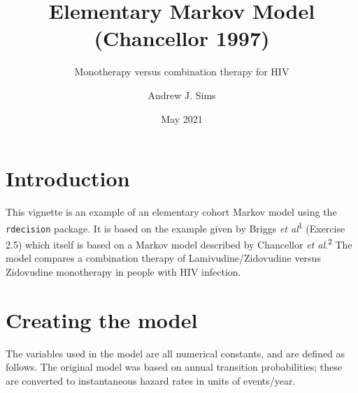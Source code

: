 \documentclass[
]{article}
\title{Elementary Markov Model (Chancellor 1997)}
\subtitle{Monotherapy versus combination therapy for HIV}
\author{Andrew J. Sims}
\date{May 2021}
\begin{document}
\maketitle

\hypertarget{introduction}{%
\section{Introduction}\label{introduction}}

This vignette is an example of an elementary cohort Markov model using
the \texttt{rdecision} package. It is based on the example given by
Briggs \emph{et al}\textsuperscript{1} (Exercise 2.5) which itself is
based on a Markov model described by Chancellor \emph{et
al}.\textsuperscript{2} The model compares a combination therapy of
Lamivudine/Zidovudine versus Zidovudine monotherapy in people with HIV
infection.

\hypertarget{creating-the-model}{%
\section{Creating the model}\label{creating-the-model}}

The variables used in the model are all numerical constants, and are
defined as follows. The original model was based on annual transition
probabilities; these are converted to instantaneous hazard rates in
units of events/year.
\end{document}
